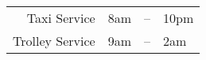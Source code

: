 \begin{center}
  \begin{tabular}{rrcl}
    \hline \large
    Taxi Service & \indent 8am & -- & 10pm \\
    Trolley Service & \indent 9am & -- & 2am \\
    \hline
  \end{tabular}
\end{center}

